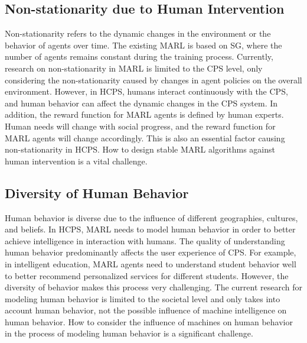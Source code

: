 \documentclass[acmsmall]{acmart}
\begin{document}
\subsection{Non-stationarity due to Human Intervention}
Non-stationarity refers to the dynamic changes in the environment or the behavior of agents over time. The existing MARL is based on SG, where the number of agents remains constant during the training process. Currently, research on non-stationarity in MARL is limited to the CPS level, only considering the non-stationarity caused by changes in agent policies on the overall environment\cite{}. However, in HCPS, humans interact continuously with the CPS, and human behavior can affect the dynamic changes in the CPS system. In addition, the reward function for MARL agents is defined by human experts. Human needs will change with social progress, and the reward function for MARL agents will change accordingly. This is also an essential factor causing non-stationarity in HCPS. How to design stable MARL algorithms against human intervention is a vital challenge.
\subsection{Diversity of Human Behavior}
Human behavior is diverse due to the influence of different geographies, cultures, and beliefs. In HCPS, MARL needs to model human behavior in order to better achieve intelligence in interaction with humans. The quality of understanding human behavior predominantly affects the user experience of CPS. For example, in intelligent education, MARL agents need to understand student behavior well to better recommend personalized services for different students. However, the diversity of behavior makes this process very challenging. The current research for modeling human behavior is limited to the societal level and only takes into account human behavior, not the possible influence of machine intelligence on human behavior. How to consider the influence of machines on human behavior in the process of modeling human behavior is a significant challenge.
\end{document}
